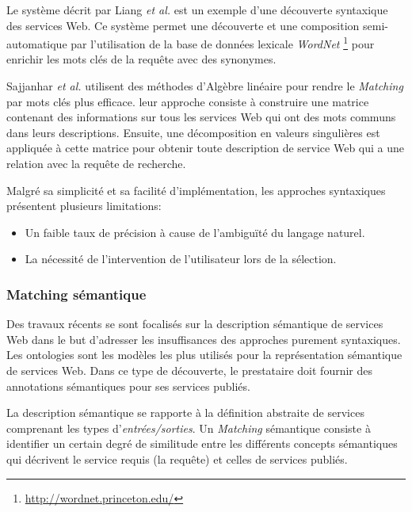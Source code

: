     Le système décrit par Liang \textit{et al.}
    \cite{DBLP:journals/jwsr/LiangCSCL04} est un exemple d'une
    découverte syntaxique des services Web. Ce système permet une
    découverte et une composition semi-automatique par l'utilisation
    de la base de données lexicale \textit{WordNet}
    \footnote{\url{http://wordnet.princeton.edu/}}
    \cite{miller1990introduction} pour enrichir les mots clés de la
    requête avec des synonymes.\medskip

    Sajjanhar \textit{et al.} \cite{sajjanhar2004algorithm} utilisent
    des méthodes d'Algèbre linéaire pour rendre le \textit{Matching}
    par mots clés plus efficace. leur approche consiste à construire
    une matrice contenant des informations sur tous les services Web
    qui ont des mots communs dans leurs descriptions. Ensuite, une
    décomposition en valeurs singulières est appliquée à cette matrice
    pour obtenir toute description de service Web qui a une relation
    avec la requête de recherche.\medskip

    Malgré sa simplicité et sa facilité d'implémentation, les
    approches syntaxiques présentent plusieurs limitations:

    \begin{itemize}\renewcommand\labelitemi{--}
    \item Un faible taux de précision à cause de l'ambiguïté du
      langage naturel.
    \item La nécessité de l'intervention de l'utilisateur lors de
      la sélection.
    \end{itemize}

    \subsubsection{Matching sémantique}
    \label{sec:matching-semanique}
    Des travaux récents \cite{paolucci2002semantic,
      benatallah2005automating, keller2004wsmo, benatallah2003request,
      jaeger2005ranked} se sont focalisés sur la description
    sémantique de services Web dans le but d'adresser les
    insuffisances des approches purement syntaxiques. Les ontologies
    sont les modèles les plus utilisés pour la représentation
    sémantique de services Web. Dans ce type de découverte, le
    prestataire doit fournir des annotations sémantiques pour ses
    services publiés.\medskip

    La description sémantique se rapporte à la définition abstraite de
    services comprenant les types d'\textit{entrées/sorties}. Un
    \textit{Matching} sémantique consiste à identifier un certain
    degré de similitude entre les différents concepts sémantiques qui
    décrivent le service requis (la requête) et celles de services
    publiés.\bigskip

